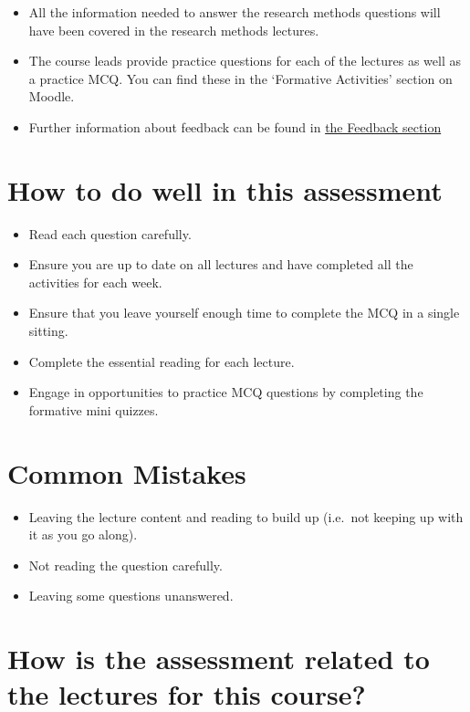 \documentclass[
  english,
  letterpaper,
  DIV=11,
  numbers=noendperiod]{scrreprt}
\begin{document}
\begin{itemize}
\item
  All the information needed to answer the research methods questions
  will have been covered in the research methods lectures.
\item
  The course leads provide practice questions for each of the lectures
  as well as a practice MCQ. You can find these in the `Formative
  Activities' section on Moodle.
\item
  Further information about feedback can be found in
  \hyperref[MCQ_feedback]{the Feedback section}
\end{itemize}

\section{How to do well in this
assessment}\label{how-to-do-well-in-this-assessment-1}

\begin{itemize}
\item
  Read each question carefully.
\item
  Ensure you are up to date on all lectures and have completed all the
  activities for each week.
\item
  Ensure that you leave yourself enough time to complete the MCQ in a
  single sitting.
\item
  Complete the essential reading for each lecture.
\item
  Engage in opportunities to practice MCQ questions by completing the
  formative mini quizzes.
\end{itemize}

\section{Common Mistakes}\label{common-mistakes-1}

\begin{itemize}
\item
  Leaving the lecture content and reading to build up (i.e.~not keeping
  up with it as you go along).
\item
  Not reading the question carefully.
\item
  Leaving some questions unanswered.
\end{itemize}

\section{How is the assessment related to the lectures for this
course?}\label{how-is-the-assessment-related-to-the-lectures-for-this-course-1}
\end{document}
